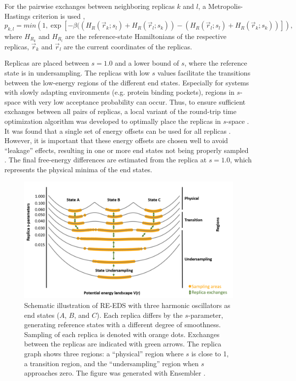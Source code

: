 For the pairwise exchanges between neighboring replicas $k$ and $l$, a Metropolis-Hastings criterion \cite{Hastings1970} is used \cite{Sidler2016,Sugita2000},
\begin{equation}
    p_{k,l} = min\left(1, \exp \left[-\beta ((H_{R}(\vec{r}_k; s_l)+H_{R}(\vec{r}_l; s_k))-(H_{R}(\vec{r}_l; s_l)+H_{R}(\vec{r}_k; s_k)) \right] \right) ,
\end{equation}
where $H_{R_k}$ and $H_{R_l}$ are the reference-state Hamiltonians of the respective replicas, $\vec{r}_k$ and $\vec{r}_l$ are the current coordinates of the replicas.

Replicas are placed between $s=1.0$ and a lower bound of $s$, where the reference state is in undersampling. The replicas with low $s$ values facilitate the transitions between the low-energy regions of the  different end states. Especially for systems with slowly adapting environments (e.g. protein binding pockets), regions in $s$-space with very low acceptance probability can occur. Thus, to ensure sufficient exchanges between all pairs of replicas, a local variant of the round-trip time optimization algorithm \cite{Katzgraber2006, Nadler2008} was developed to optimally place the replicas in $s$-space \cite{Sidler2017}.
It was found that a single set of energy offsets can be used for all replicas \cite{Sidler2016}. However, it is important that these energy offsets are chosen well to avoid ``leakage'' effects, resulting in one or more end states not being properly sampled \cite{Sidler2016}.
The final free-energy differences are estimated from the replica at $s=1.0$, which represents the physical minima of the end states.

\begin{figure}[h]
    \centering
    \includegraphics[width=\columnwidth]{fig/theory/Reeds_scheme_first.png}
    \caption{Schematic illustration of RE-EDS with three harmonic oscillators as end states ($A$, $B$, and $C$). Each replica differs by the $s$-parameter, generating reference states with a different degree of smoothness. Sampling of each replica is denoted with orange dots. Exchanges between the replicas are indicated with green arrows. The replica graph shows three regions: a ``physical'' region where $s$ is close to 1, a transition region, and the ``undersampling'' region when $s$ approaches zero. The figure was generated with Ensembler \cite{Ries2021A}.}
    \label{fig:RE-EDS_Scheme}
\end{figure}

